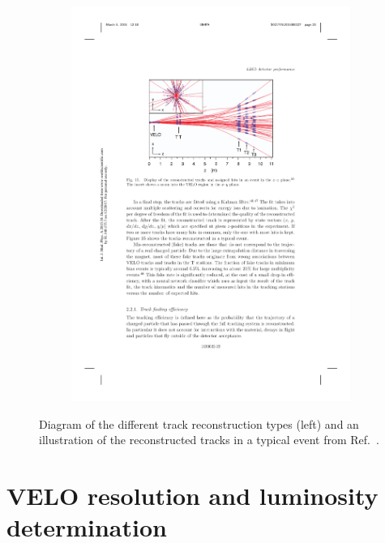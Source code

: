 \begin{figure}[!h]
\begin{subfigure}[t]{0.4\textwidth}
    \end{subfigure}
    \begin{subfigure}[t]{0.4\textwidth}
        \centering
        \includegraphics[width=1.0\textwidth]{figs/Detector/reco_track_reco.pdf}
    \end{subfigure}
    \caption{Diagram of the different track reconstruction types (left) and an illustration of the reconstructed tracks in a typical event from Ref.~\cite{LHCb-DP-2014-002}.}
    \label{fig:Dec_reco_tracks}   
\end{figure}

\section{VELO resolution and luminosity determination}